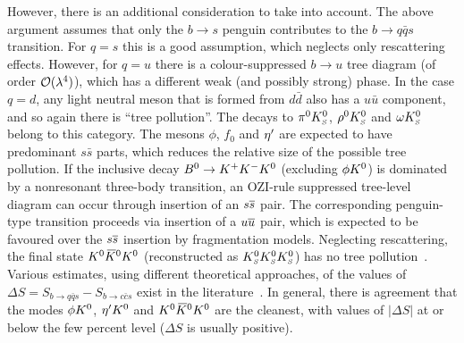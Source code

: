 However, there is an additional consideration to take into account.
The above argument assumes that only the $b \to s$ penguin contributes
to the $b \to q\bar q s$ transition.
For $q = s$ this is a good assumption, which neglects only rescattering effects.
However, for $q = u$ there is a colour-suppressed $b \to u$ tree diagram
(of order ${\cal O}(\lambda^4)$), 
which has a different weak (and possibly strong) phase.
In the case $q = d$, any light neutral meson that is formed from $d \bar{d}$ 
also has a $u \bar{u}$ component, and so again there is ``tree pollution''. 
The \Bz decays to $\pi^0K^0_{\scriptscriptstyle S}$, $\rho^0K^0_{\scriptscriptstyle S}$ and $\omega K^0_{\scriptscriptstyle S}$ belong to this category.
The mesons $\phi$, $f_0$ and ${\eta^{\prime}}$ are expected to have predominant
$s\bar{s}$ parts, which reduces the relative size of the possible tree
pollution. 
If the inclusive decay $B^0\to K^+K^-K^0$ (excluding $\phi K^0$) is dominated by
a nonresonant three-body transition, 
an OZI-rule suppressed tree-level diagram can occur 
through insertion of an $s\overline s$ pair. 
The corresponding penguin-type transition 
proceeds via insertion of a $u\overline u$ pair, which is expected
to be favoured over the $s\overline s$ insertion by fragmentation models.
Neglecting rescattering, the final state $K^0\kern 0.2em\overline{\kern -0.2em K}{}^0K^0$ 
(reconstructed as $K^0_{\scriptscriptstyle S}K^0_{\scriptscriptstyle S}K^0_{\scriptscriptstyle S}$) has no tree pollution~\cite{Gershon:2004tk}.
Various estimates, using different theoretical approaches,
of the values of $\Delta S = S_{b \to q\bar q s} - S_{b \to c\bar c s}$
exist in the literature~\cite{Grossman:2003qp,Gronau:2003ep,Gronau:2003kx,Gronau:2004hp,Cheng:2005bg,Gronau:2005gz,Buchalla:2005us,Beneke:2005pu,Engelhard:2005hu,Cheng:2005ug,Engelhard:2005ky,Gronau:2006qh,Silvestrini:2007yf,Dutta:2008xw}.
In general, there is agreement that the modes
$\phi K^0$, ${\eta^{\prime}}K^0$ and $K^0\kern 0.2em\overline{\kern -0.2em K}{}^0K^0$ are the cleanest,
with values of $\left| \Delta S \right|$ at or below the few percent level 
($\Delta S$ is usually positive).

\label{sec:cp_uta:qqs:cp_eigen}

